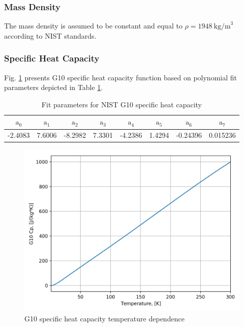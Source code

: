  \subsubsection{Mass Density}
 The mass density is assumed to be constant and equal to $\rho = 1948~\text{kg/m}^{3}$ according to NIST standards.

\subsubsection{Specific Heat Capacity}
Fig. \ref{fig:g10_cp_plot} presents G10 specific heat capacity function based on polynomial fit parameters depicted in Table \ref{table:nist_g10_cp_parameters}.

\begin{table}[h!]
    \caption{Fit parameters for NIST G10 specific heat capacity} 
    \vspace{-1.em} 
    \fontsize{10}{10}
    \selectfont 
    \renewcommand{\arraystretch}{1.5}
    \begin{center}
    \begin{tabular}{ cccccccc }  
    $\text{a}_0$ & $\text{a}_1$ & $\text{a}_2$ & $\text{a}_3$ & $\text{a}_4$ & $\text{a}_5$ & $\text{a}_6$ & $\text{a}_7$ \\
    \hline
    -2.4083 & 7.6006 & -8.2982 & 7.3301 & -4.2386 & 1.4294 & -0.24396 & 0.015236 \\
    \hline 
    \end{tabular}
    \end{center}  
     \label{table:nist_g10_cp_parameters} 
 \end{table}

 \begin{figure}[h!]
    \centering
    \includegraphics[width=0.49\linewidth]{figures/material_properties/G10_Cp_plot.png}
    \caption{G10 specific heat capacity temperature dependence}
    \label{fig:g10_cp_plot}
\end{figure}